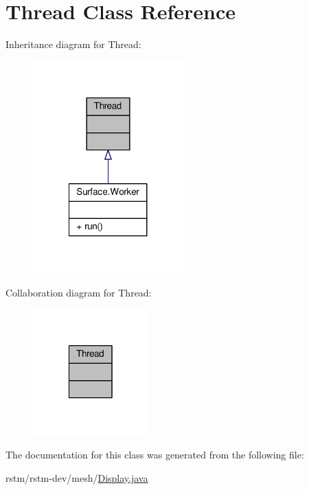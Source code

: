 \hypertarget{classThread}{\section{Thread Class Reference}
\label{classThread}
}


Inheritance diagram for Thread\-:
\nopagebreak
\begin{figure}[H]
\begin{center}
\leavevmode
\includegraphics[width=164pt]{classThread__inherit__graph}
\end{center}
\end{figure}


Collaboration diagram for Thread\-:
\nopagebreak
\begin{figure}[H]
\begin{center}
\leavevmode
\includegraphics[width=126pt]{classThread__coll__graph}
\end{center}
\end{figure}


The documentation for this class was generated from the following file\-:\begin{DoxyCompactItemize}
\item 
rstm/rstm-\/dev/mesh/\hyperlink{Display_8java}{Display.\-java}\end{DoxyCompactItemize}
